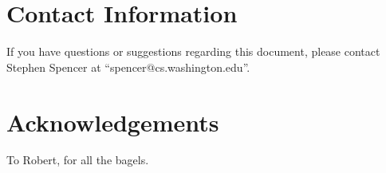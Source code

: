 \documentclass[tog]{acmsiggraph}
\begin{document}
\section{Contact Information}

If you have questions or suggestions regarding this document, please
contact Stephen Spencer at ``spencer@cs.washington.edu''.


\section*{Acknowledgements}

To Robert, for all the bagels.

\textbf{}


\nocite{*}

\end{document}

